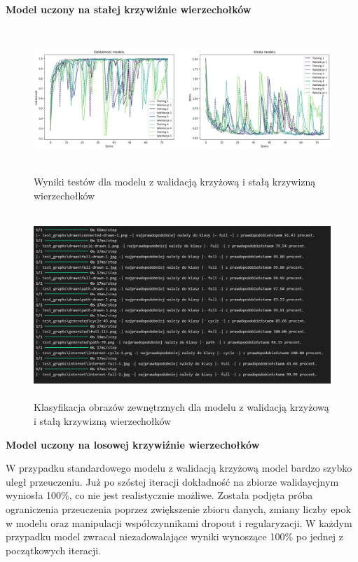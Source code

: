 \textbf{Model uczony na stałej krzywiźnie wierzechołków}

\begin{figure}[ht]
	\centering
	\includegraphics[height=5.5cm]{resources/tests/images/v2/crossvalid_img.png}
	\caption{Wyniki testów dla modelu z walidacją krzyżową i stałą krzywizną wierzechołków}
	\label{Fig:tests-cv-1}
\end{figure}
\FloatBarrier

\begin{figure}[ht]
	\centering
	\includegraphics[height=7cm]{resources/tests/images/v2/crossvalid_txt.png}
	\caption{Klasyfikacja obrazów zewnętrznych dla modelu z walidacją krzyżową i stałą krzywizną wierzechołków}
	\label{Fig:tests-cv-2}
\end{figure}
\FloatBarrier

\textbf{Model uczony na losowej krzywiźnie wierzechołków}

W przypadku standardowego modelu z walidacją krzyżową model bardzo szybko uległ przeuczeniu.
Już po szóstej iteracji dokładność na zbiorze walidaycjnym wyniosła 100\%, co nie jest realistycznie możliwe.
Została podjęta próba ograniczenia przeuczenia poprzez zwiększenie zbioru danych, zmiany liczby epok w modelu
oraz manipulacji współczynnikami dropout i regularyzacji.
W każdym przypadku model zwracał niezadowalające wyniki wynoszące 100\% po jednej z początkowych iteracji.

